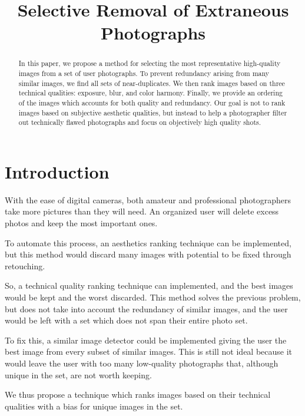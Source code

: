 \documentclass{article}
\begin{document}
\sloppy

\title{
Selective Removal of Extraneous Photographs
}

\address{[ksamii,acarlisl]@ucsc.edu,[uliana,davis]@soe.ucsc.edu}

\maketitle	
\begin{abstract}
In this paper, we propose a method for selecting the most representative high-quality images from a set of user photographs. To prevent redundancy arising from many similar images, we find all sets of near-duplicates. We then rank images based on three technical qualities: exposure, blur, and color harmony. Finally, we provide an ordering of the images which accounts for both quality and redundancy. Our goal is not to rank images based on subjective aesthetic qualities, but instead to help a photographer filter out technically flawed photographs and focus on objectively high quality shots.
\end{abstract}	

\section{Introduction}
With the ease of digital cameras, both amateur and professional photographers take more pictures than they will need. An organized user will delete excess photos and keep the most important ones.

To automate this process, an aesthetics ranking technique can be implemented, but this method would discard many images with potential to be fixed through retouching.

So, a technical quality ranking technique can implemented, and the best images would be kept and the worst discarded. This method solves the previous problem, but does not take into account the redundancy of similar images, and the user would be left with a set which does not span their entire photo set.

To fix this, a similar image detector could be implemented giving the user the best image from every subset of similar images. This is still not ideal because it would leave the user with too many low-quality photographs that, although unique in the set, are not worth keeping.

We thus propose a technique which ranks images based on their technical qualities with a bias for unique images in the set.
\end{document}
